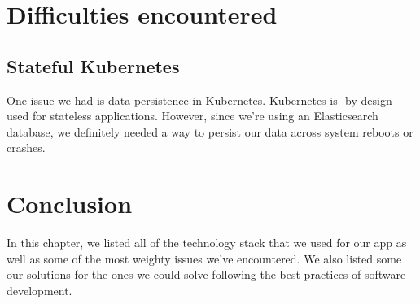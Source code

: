 \section{Difficulties encountered}
\subsection{Stateful Kubernetes}
One issue we had is data persistence in Kubernetes.
Kubernetes is -by design- used for stateless applications.
However, since we're using an Elasticsearch database, we definitely needed a way to persist our data across system reboots or crashes.

\setcounter{secnumdepth}{0} %
\section{Conclusion}
In this chapter, we listed all of the technology stack that we used for our app as well as some of the most weighty issues we've encountered.
We also listed some our solutions for the ones we could solve following the best practices of software development.
